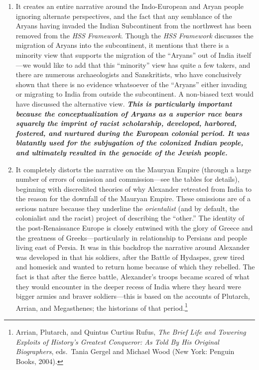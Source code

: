 \begin{enumerate} 
\item It creates an entire narrative around the Indo-European and Aryan people ignoring alternate perspectives, and the fact that any semblance of the Aryans having invaded the Indian Subcontinent from the northwest has been removed from the \textit{HSS Framework}. Though the \textit{HSS Framework} discusses the migration of Aryans into the subcontinent, it mentions that there is a minority view that supports the migration of the “Aryans” out of India itself—we would like to add that this “minority” view has quite a few takers, and there are numerous archaeologists and Sanskritists, who have conclusively shown that there is no evidence whatsoever of the “Aryans” either invading or migrating to India from outside the subcontinent. A non-biased text would have discussed the alternative view. \textit{\textbf{This is particularly important because the conceptualization of Aryans as a superior race bears squarely the imprint of racist scholarship, developed, harbored, fostered, and nurtured during the European colonial period. It was blatantly used for the subjugation of the colonized Indian people, and ultimately resulted in the genocide of the Jewish people.}} 

\item It completely distorts the narrative on the Mauryan Empire (through a large number of errors of omission and commission—see the tables for details), beginning with discredited theories of why Alexander retreated from India to the reason for the downfall of the Mauryan Empire. These omissions are of a serious nature because they underline the \textit{orientalist} (and by default, the colonialist and the racist) project of describing the “other.” The identity of the post-Renaissance Europe is closely entwined with the glory of Greece and the greatness of Greeks—particularly in relationship to Persians and people living east of Persia. It was in this backdrop the narrative around Alexander was developed in that his soldiers, after the Battle of Hydaspes, grew tired and homesick and wanted to return home because of which they rebelled. The fact is that after the fierce battle, Alexander’s troops became scared of what they would encounter in the deeper recess of India where they heard were bigger armies and braver soldiers—this is based on the accounts of Plutarch, Arrian, and Megasthenes; the historians of that period.\footnote{Arrian, Plutarch, and Quintus Curtius Rufus, \textit{The Brief Life and Towering Exploits of History's Greatest Conqueror: As Told By His Original Biographers}, eds.\ Tania Gergel and Michael Wood (New York: Penguin Books, 2004).} 


\end{enumerate}
